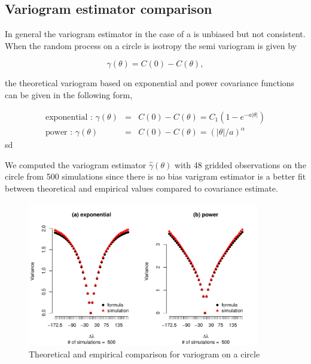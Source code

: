 	      	      
\subsection{Variogram estimator comparison} 

In general the variogram estimator in the case of a is unbiased but not consistent. When the random process on a circle is isotropy the semi variogram is given by 

\[ 
\gamma(\theta) = C(0) - C(\theta),
\]

the theoretical variogram based on exponential and power covariance functions can be given in the following form,   

\begin{eqnarray*}
	\mbox{exponential : }\gamma(\theta) &=& C(0) - C(\theta) = C_1(1-e^{-a|\theta|}) \\
	\mbox{power : } \gamma(\theta) &=& C(0) - C(\theta) = (|\theta|/a)^{\alpha}
\end{eqnarray*}sd

We computed the variogram estimator $\hat{\gamma}(\theta)$ with 48 gridded observations on the circle from 500 simulations since there is no bias varigram estimator is a better fit between theoretical and empirical values compared to covariance estimate.


\begin{figure}[H]
	\centering
	\includegraphics[width=0.9\textwidth]{graphs/variogram_plot_500}
	\caption {Theoretical and empirical comparison for variogram on a circle}
\end{figure}





